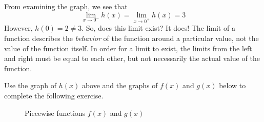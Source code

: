 From examining the graph, we see that $$\lim_{x\to 0^-}h(x) = \lim_{x\to 0^+}h(x) = 3$$
However, $h(0) = 2 \neq 3$. So, does this limit exist? It does! The limit of a 
function describes the \textit{behavior} of the function around a particular value, 
not the value of the function itself. In order for a limit to exist, the limits 
from the left and right must be equal to each other, but not necessarily the actual 
value of the function. 

Use the graph of $h(x)$ above and the graphs of $f(x)$ and $g(x)$ below to complete 
the following exercise.
\begin{figure}[H]
\centering
{}
\caption{Piecewise functions $f(x)$ and $g(x)$}
\end{figure}

